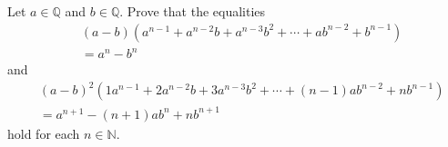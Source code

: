 \documentclass[paper=a4, fontsize=12pt]{scrartcl} %
\newcommand{\QQ}{\mathbb{Q}} %
\newcommand{\NN}{\mathbb{N}} %
\newcommand{\tup}[1]{\left( #1 \right)}
\theoremstyle{plainsl}
\theoremstyle{definition}
\theoremstyle{remark}
\begin{document}
Let $a \in \QQ$ and $b \in \QQ$.
Prove that the equalities
\begin{align}
& \tup{a-b} \tup{ a^{n-1} + a^{n-2} b + a^{n-3} b^2 + \cdots + a b^{n-2} + b^{n-1} } \nonumber \\
& = a^n - b^n
\label{eq.exe.geo-series.1}
\end{align}
and
\begin{align}
& \tup{a-b}^2 \tup{ 1 a^{n-1} + 2 a^{n-2} b + 3 a^{n-3} b^2 + \cdots + \tup{n-1} a b^{n-2} + n b^{n-1} } \nonumber \\
&= a^{n+1} - \tup{n+1} a b^n + n b^{n+1}
\label{eq.exe.geo-series.2}
\end{align}
hold for each $n \in \NN$.
\end{document}
